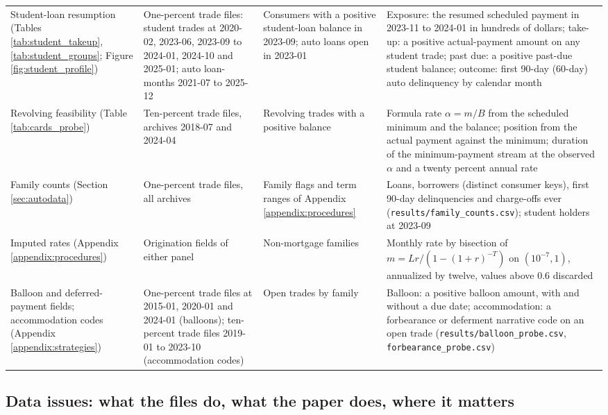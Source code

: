 \begin{longtable}{@{}>{\raggedright\arraybackslash}p{2.5cm}>{\raggedright\arraybackslash}p{3.5cm}>{\raggedright\arraybackslash}p{3.6cm}>{\raggedright\arraybackslash}p{5.2cm}@{}}
Student-loan resumption (Tables \ref{tab:student_takeup}, \ref{tab:student_groups}; Figure \ref{fig:student_profile}) & One-percent trade files: student trades at 2020-02, 2023-06, 2023-09 to 2024-01, 2024-10 and 2025-01; auto loan-months 2021-07 to 2025-12 & Consumers with a positive student-loan balance in 2023-09; auto loans open in 2023-01 & Exposure: the resumed scheduled payment in 2023-11 to 2024-01 in hundreds of dollars; take-up: a positive actual-payment amount on any student trade; past due: a positive past-due student balance; outcome: first 90-day (60-day) auto delinquency by calendar month \\
Revolving feasibility (Table \ref{tab:cards_probe}) & Ten-percent trade files, archives 2018-07 and 2024-04 & Revolving trades with a positive balance & Formula rate $\alpha = m/B$ from the scheduled minimum and the balance; position from the actual payment against the minimum; duration of the minimum-payment stream at the observed $\alpha$ and a twenty percent annual rate \\
Family counts (Section \ref{sec:autodata}) & One-percent trade files, all archives & Family flags and term ranges of Appendix \ref{appendix:procedures} & Loans, borrowers (distinct consumer keys), first 90-day delinquencies and charge-offs ever (\texttt{results/family\_counts.csv}); student holders at 2023-09 \\
Imputed rates (Appendix \ref{appendix:procedures}) & Origination fields of either panel & Non-mortgage families & Monthly rate by bisection of $m = L r/(1-(1+r)^{-T})$ on $(10^{-7}, 1)$, annualized by twelve, values above $0.6$ discarded \\
Balloon and deferred-payment fields; accommodation codes (Appendix \ref{appendix:strategies}) & One-percent trade files at 2015-01, 2020-01 and 2024-01 (balloons); ten-percent trade files 2019-01 to 2023-10 (accommodation codes) & Open trades by family & Balloon: a positive balloon amount, with and without a due date; accommodation: a forbearance or deferment narrative code on an open trade (\texttt{results/balloon\_probe.csv}, \texttt{forbearance\_probe.csv}) \\
\end{longtable}
\endgroup

\subsection{Data issues: what the files do, what the paper does, where it matters}\label{appendix:data:issues}

